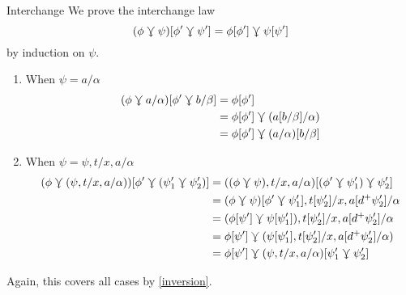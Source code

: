 \documentclass{llncs}
\begin{document}
\begin{lemma}{Interchange}
  \label{lem:sq-vcomp-hcomp}
  We prove the interchange law
  $$(\phi\curlyveedownarrow\psi)[\phi'\curlyveedownarrow\psi'] = \phi[\phi'] \curlyveedownarrow \psi[\psi']$$
  by induction on $\psi$.

  \begin{enumerate}
  \item When $\psi=a/\alpha$
      \begin{align*}
    (\phi\curlyveedownarrow a/\alpha)[\phi'\curlyveedownarrow b/\beta]
        &= \phi[\phi']\\
        &= \phi[\phi'] \curlyveedownarrow (a[b/\beta]/\alpha)\\
        &= \phi[\phi'] \curlyveedownarrow (a/\alpha)[b/\beta]
  \end{align*}
    \item When $\psi=\psi,t/x,a/\alpha$
      \begin{align*}
        (\phi\curlyveedownarrow (\psi,t/x,a/\alpha))[\phi' \curlyveedownarrow (\psi'_1\curlyveedownarrow\psi'_2)]
        &= ((\phi\curlyveedownarrow \psi),t/x,a/\alpha)[(\phi' \curlyveedownarrow \psi'_1)\curlyveedownarrow\psi'_2]\\
        &= (\phi\curlyveedownarrow \psi)[\phi' \curlyveedownarrow \psi'_1],t[\psi'_2]/x,a[d^+\psi'_2]/\alpha\\
        &= (\phi[\psi'] \curlyveedownarrow \psi[\psi'_1]),t[\psi'_2]/x,a[d^+\psi'_2]/\alpha\\
        &= \phi[\psi'] \curlyveedownarrow (\psi[\psi'_1],t[\psi'_2]/x,a[d^+\psi'_2]/\alpha)\\
        &= \phi[\psi'] \curlyveedownarrow (\psi,t/x,a/\alpha)[\psi'_1\curlyveedownarrow \psi'_2]
      \end{align*}
  \end{enumerate}
  Again, this covers all cases by \cref{inversion}.
\end{lemma}
\end{document}
